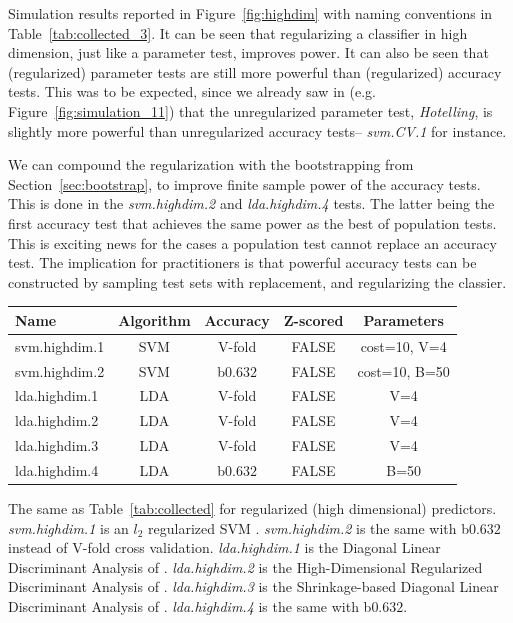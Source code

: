 \documentclass[12pt,a4paper]{article}
\theoremstyle{definition}
\begin{document}
Simulation results reported in Figure~\ref{fig:highdim} with naming conventions in Table~\ref{tab:collected_3}.
It can be seen that regularizing a classifier in high dimension, just like a parameter test, improves power. 
It can also be seen that (regularized) parameter tests are still more powerful than (regularized) accuracy tests. 
This was to be expected, since we already saw in (e.g. Figure~\ref{fig:simulation_11}) that the unregularized parameter test, \emph{Hotelling}, is slightly more powerful than unregularized accuracy tests-- \emph{svm.CV.1} for instance.

We can compound the regularization with the bootstrapping from Section~\ref{sec:bootstrap}, to improve finite sample power of the accuracy tests. 
This is done in the \emph{svm.highdim.2} and \emph{lda.highdim.4} tests. 
The latter being the first accuracy test that achieves the same power as the best of population tests. 
This is exciting news for the cases a population test cannot replace an accuracy test. 
The implication for practitioners is that powerful accuracy tests can be constructed by sampling test sets with replacement, and regularizing the classier. 


\bigskip

\begin{tcolorbox}
\centering
\begin{tabular}{l|c|c|c|c}
Name & Algorithm & Accuracy & Z-scored & Parameters\\ 
\hline
\hline
svm.highdim.1 & SVM & V-fold & FALSE & cost=10, V=4 \\ 
svm.highdim.2 & SVM & b$0.632$ & FALSE & cost=10, B=50 \\ 
lda.highdim.1 & LDA & V-fold & FALSE & V=4 \\ 
lda.highdim.2 & LDA & V-fold & FALSE & V=4 \\ 
lda.highdim.3 & LDA & V-fold & FALSE & V=4 \\ 
lda.highdim.4 & LDA & b$0.632$ & FALSE & B=50 \\ 
\end{tabular} 
\captionsetup{type=table}
\caption{
The same as Table~\ref{tab:collected} for regularized (high dimensional) predictors. 
\emph{svm.highdim.1} is an $l_2$ regularized SVM \citep{friedman_regularization_2010}. 
\emph{svm.highdim.2} is the same with b$0.632$ instead of V-fold cross validation. 
\emph{lda.highdim.1} is the Diagonal Linear Discriminant Analysis of \cite{dudoit_comparison_2002}.
\emph{lda.highdim.2} is the High-Dimensional Regularized Discriminant Analysis of \cite{ramey_high-dimensional_2016}.
\emph{lda.highdim.3} is the Shrinkage-based Diagonal Linear Discriminant Analysis of \cite{pang_shrinkage-based_2009}.
\emph{lda.highdim.4} is the same with b$0.632$.
} 
\label{tab:collected_3}
\end{tcolorbox}
\end{document}

